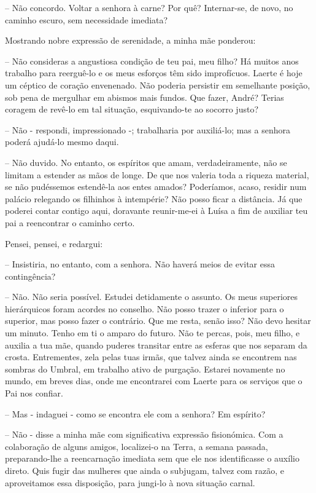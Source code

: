 \documentclass[portuguese,12pt,a4paper]{scrbook}
\begin{document}
	– Não concordo. Voltar a senhora à carne? Por quê? Internar-se, de novo, no caminho escuro, sem necessidade imediata?
	
	Mostrando nobre expressão de serenidade, a minha mãe ponderou:
	
	– Não consideras a angustiosa condição de teu pai, meu filho? Há muitos anos trabalho para reerguê-lo e os meus esforços têm sido improfícuos. Laerte é hoje um céptico de coração envenenado. Não poderia persistir em semelhante posição, sob pena de mergulhar em abismos mais fundos. Que fazer, André? Terias coragem de revê-lo em tal situação, esquivando-te ao socorro justo?
	
	– Não - respondi, impressionado -; trabalharia por auxiliá-lo; mas a senhora poderá ajudá-lo mesmo daqui.
	
	
	– Não duvido. No entanto, os espíritos que amam, verdadeiramente, não se limitam a estender as mãos de longe. De que nos valeria toda a riqueza material, se não pudéssemos estendê-la aos entes amados? Poderíamos, acaso, residir num palácio relegando os filhinhos à intempérie? Não posso ficar a distância. Já que poderei contar contigo aqui, doravante reunir-me-ei à Luísa a fim de auxiliar teu pai a reencontrar o caminho certo.
	
	Pensei, pensei, e redargui:
	
	– Insistiria, no entanto, com a senhora. Não haverá meios de evitar essa contingência?
	
	– Não. Não seria possível. Estudei detidamente o assunto. Os meus superiores hierárquicos foram acordes no conselho. Não posso trazer o inferior para o superior, mas posso fazer o contrário. Que me resta, senão isso? Não devo hesitar um minuto. Tenho em ti o amparo do futuro. Não te percas, pois, meu filho, e auxilia a tua mãe, quando puderes transitar entre as esferas que nos separam da crosta. Entrementes, zela pelas tuas irmãs, que talvez ainda se encontrem nas sombras do Umbral, em trabalho ativo de purgação. Estarei novamente no mundo, em breves dias, onde me encontrarei com Laerte para os serviços que o Pai nos confiar.
	
	– Mas - indaguei - como se encontra ele com a senhora? Em espírito?
	
	– Não - disse a minha mãe com significativa expressão fisionómica. Com a colaboração de alguns amigos, localizei-o na Terra, a semana passada, preparando-lhe a reencarnação imediata sem que ele nos identificasse o auxílio direto. Quis fugir das mulheres que ainda o subjugam, talvez com razão, e aproveitamos essa disposição, para jungi-lo à nova situação carnal.
	
\end{document}
